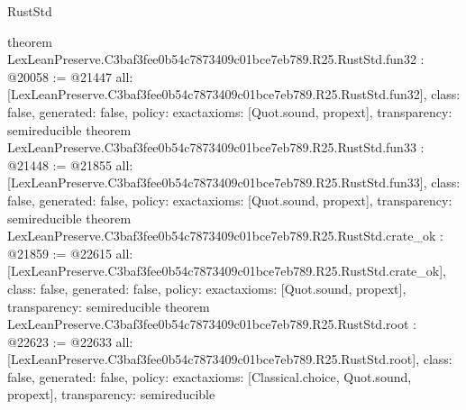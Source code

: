 \begin{lexlean}{RustStd}
\begin{coremodule}
{}
theorem LexLeanPreserve.C3baf3fee0b54c7873409c01bce7eb789.R25.RustStd.fun32 : @20058 := @21447 {
  all: [LexLeanPreserve.C3baf3fee0b54c7873409c01bce7eb789.R25.RustStd.fun32],
  class: false,
  generated: false,
  policy: exact{axioms: [Quot.sound, propext]},
  transparency: semireducible
}
theorem LexLeanPreserve.C3baf3fee0b54c7873409c01bce7eb789.R25.RustStd.fun33 : @21448 := @21855 {
  all: [LexLeanPreserve.C3baf3fee0b54c7873409c01bce7eb789.R25.RustStd.fun33],
  class: false,
  generated: false,
  policy: exact{axioms: [Quot.sound, propext]},
  transparency: semireducible
}
theorem LexLeanPreserve.C3baf3fee0b54c7873409c01bce7eb789.R25.RustStd.crate_ok : @21859 := @22615 {
  all: [LexLeanPreserve.C3baf3fee0b54c7873409c01bce7eb789.R25.RustStd.crate_ok],
  class: false,
  generated: false,
  policy: exact{axioms: [Quot.sound, propext]},
  transparency: semireducible
}
theorem LexLeanPreserve.C3baf3fee0b54c7873409c01bce7eb789.R25.RustStd.root : @22623 := @22633 {
  all: [LexLeanPreserve.C3baf3fee0b54c7873409c01bce7eb789.R25.RustStd.root],
  class: false,
  generated: false,
  policy: exact{axioms: [Classical.choice, Quot.sound, propext]},
  transparency: semireducible
}


\end{coremodule}
\end{lexlean}
